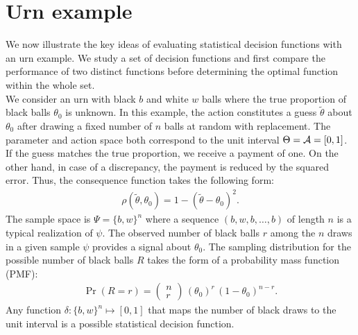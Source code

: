 \section*{Urn example}
We now illustrate the key ideas of evaluating statistical decision functions with an urn example. We study a set of decision functions and first compare the performance of two distinct functions before determining the optimal function within the whole set.\\

We consider an urn with black $b$ and white $w$ balls where the true proportion of black balls $\theta_0$ is unknown. In this example, the action constitutes a guess $\tilde{\theta}$ about $\theta_0$ after drawing a fixed number of $n$ balls at random with replacement. The parameter and action space both correspond to the unit interval $\Theta = \mathcal{A} = [0, 1]$. \\

If the guess matches the true proportion, we receive a payment of one. On the other hand, in case of a discrepancy, the payment is reduced by the squared error. Thus, the consequence function takes the following form:
%
\begin{align*}
\rho(\tilde{\theta}, \theta_0) = 1 - (\tilde{\theta} - \theta_0)^2.
\end{align*}
%
The sample space is $\Psi = \{b, w\}^n$ where a sequence $(b, w, b, \hdots, b)$ of length $n$ is a typical realization of $\psi$. The observed number of black balls $r$ among the $n$ draws in a given sample $\psi$ provides a signal about $\theta_0$. The sampling distribution for the possible number of black balls $R$ takes the form of a probability mass function (PMF):
%
\begin{align*}
\Pr(R = r) = \left(\begin{array}{c} n \\ r \end{array} \right)\, (\theta_0)^r\, (1 - \theta_0)^{n-r}.
\end{align*}
%
Any function $\delta:  \{b, w\}^n \mapsto [0, 1]$ that maps the number of black draws to the unit interval is a possible statistical decision function.\\

